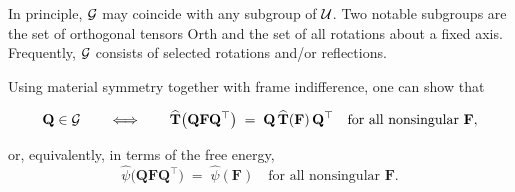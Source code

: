 In principle, \(\mathcal{G}\) may coincide with any subgroup of \(\mathcal{U}\).
Two notable subgroups are the set of orthogonal tensors Orth and the set of all rotations about a fixed axis.
Frequently, \(\mathcal{G}\) consists of selected rotations and/or reflections.

Using material symmetry together with frame indifference,
one can show that 
\begin{definition}

\begin{equation}\label{matsym}
\mathbf{Q}\in\mathcal{G} \qquad \Longleftrightarrow\qquad	\widehat{\mathbf{T}}\bigl(\mathbf{Q}\mathbf{F}\mathbf{Q}^\top\bigr)
\;=\;
\mathbf{Q}\,\widehat{\mathbf{T}}(\mathbf{F})\,\mathbf{Q}^\top
\quad\text{for all nonsingular } \mathbf{F}, 
\end{equation}

\end{definition}
or, equivalently, in terms of the free energy,
\[
\widehat{\psi}\bigl(\mathbf{Q}\mathbf{F}\mathbf{Q}^\top\bigr)
\;=\;
\widehat{\psi}(\mathbf{F})
\quad\text{for all nonsingular } \mathbf{F}.
\]

